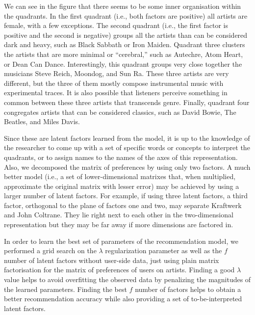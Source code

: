 We can see in the figure that there seems to be some inner organisation within the quadrants. 
In the first quadrant (i.e., both factors are positive) all artists are female, with a few exceptions.
The second quadrant (i.e., the first factor is positive and the second is negative) groups all the artists than can be considered dark and heavy, such as Black Sabbath or Iron Maiden. 
Quadrant three clusters the artists that are more minimal or ``cerebral,'' such as Autechre, Atom Heart, or Dean Can Dance. 
Interestingly, this quadrant groups very close together the musicians Steve Reich, Moondog, and Sun Ra. These three artists are very different, but the three of them mostly compose instrumental music with experimental traces. It is also possible that listeners perceive something in common between these three artists that transcends genre.
Finally, quadrant four congregates artists that can be considered classics, such as David Bowie, The Beatles, and Miles Davis. 

Since these are latent factors learned from the model, it is up to the knowledge of the researcher to come up with a set of specific words or concepts to interpret the quadrants, or to assign names to the names of the axes of this representation. 
Also, we decomposed the matrix of preferences by using only two factors. A much better model (i.e., a set of lower-dimensional matrixes that, when multiplied, approximate the original matrix with lesser error) may be achieved by using a larger number of latent factors. For example, if using three latent factors, a third factor, orthogonal to the plane of factors one and two, may separate Kraftwerk and John Coltrane. They lie right next to each other in the two-dimensional representation but they may be far away if more dimensions are factored in.



In order to learn the best set of parameters of the recommendation model, we performed a grid search on the $\lambda$ regularization parameter as well as the $f$ number of latent factors without user-side data, just using  plain matrix factorisation for the matrix of  preferences of users on artists.
Finding a good $\lambda$ value helps to avoid overfitting the observed data by penalizing the magnitudes of the learned parameters. Finding the best $f$ number of factors helps to obtain a better recommendation accuracy while also providing a set of to-be-interpreted latent factors. 

